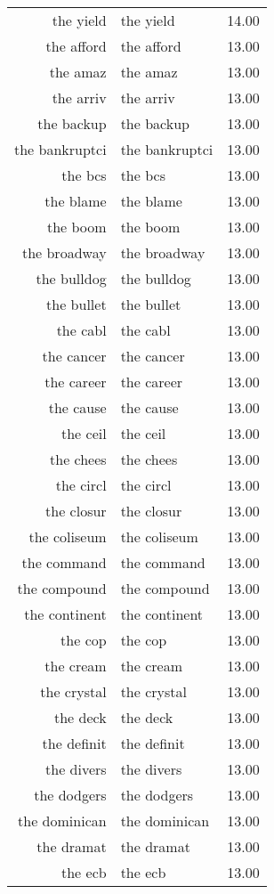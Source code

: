 \begin{table}[ht]
\begin{tabular}{rlr}
  the yield & the yield & 14.00 \\ 
  the afford & the afford & 13.00 \\ 
  the amaz & the amaz & 13.00 \\ 
  the arriv & the arriv & 13.00 \\ 
  the backup & the backup & 13.00 \\ 
  the bankruptci & the bankruptci & 13.00 \\ 
  the bcs & the bcs & 13.00 \\ 
  the blame & the blame & 13.00 \\ 
  the boom & the boom & 13.00 \\ 
  the broadway & the broadway & 13.00 \\ 
  the bulldog & the bulldog & 13.00 \\ 
  the bullet & the bullet & 13.00 \\ 
  the cabl & the cabl & 13.00 \\ 
  the cancer & the cancer & 13.00 \\ 
  the career & the career & 13.00 \\ 
  the cause & the cause & 13.00 \\ 
  the ceil & the ceil & 13.00 \\ 
  the chees & the chees & 13.00 \\ 
  the circl & the circl & 13.00 \\ 
  the closur & the closur & 13.00 \\ 
  the coliseum & the coliseum & 13.00 \\ 
  the command & the command & 13.00 \\ 
  the compound & the compound & 13.00 \\ 
  the continent & the continent & 13.00 \\ 
  the cop & the cop & 13.00 \\ 
  the cream & the cream & 13.00 \\ 
  the crystal & the crystal & 13.00 \\ 
  the deck & the deck & 13.00 \\ 
  the definit & the definit & 13.00 \\ 
  the divers & the divers & 13.00 \\ 
  the dodgers & the dodgers & 13.00 \\ 
  the dominican & the dominican & 13.00 \\ 
  the dramat & the dramat & 13.00 \\ 
  the ecb & the ecb & 13.00 \\ 

\end{tabular}
\end{table}
